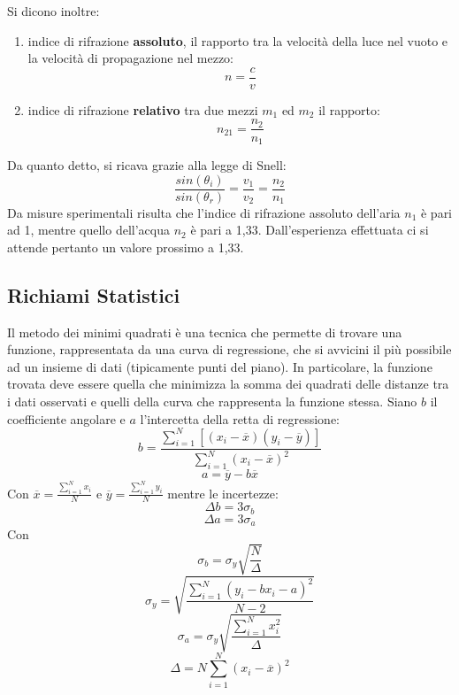 Si dicono inoltre:
\begin{enumerate}
    \item indice di rifrazione \textbf{assoluto}, il rapporto tra la velocità della luce nel vuoto e la velocità di propagazione nel mezzo: 
    \begin{equation}
        n = \frac{c}{v}
    \end{equation}
    \item indice di rifrazione \textbf{relativo} tra due mezzi $m_1$ ed $m_2$ il rapporto:
    \begin{equation}
        n_{21} = \frac{n_2}{n_1}
    \end{equation}
\end{enumerate}
Da quanto detto, si ricava grazie alla legge di Snell:
\begin{equation}
    \frac{sin(\theta_i)}{sin(\theta_r)} = \frac{v_1}{v_2} = \frac{n_2}{n_1}
\end{equation}
Da misure sperimentali risulta che l'indice di rifrazione assoluto dell'aria $n_1$ è pari ad 1, mentre quello dell'acqua $n_2$ è pari a 1,33. Dall'esperienza effettuata ci si attende pertanto un valore prossimo a 1,33.



\subsection{Richiami Statistici}
Il metodo dei minimi quadrati è una tecnica che permette di trovare una funzione, rappresentata da una curva di regressione, che si avvicini il più possibile ad un insieme di dati (tipicamente punti del piano). In particolare, la funzione trovata deve essere quella che minimizza la somma dei quadrati delle distanze tra i dati osservati e quelli della curva che rappresenta la funzione stessa. Siano $b$ il coefficiente angolare e $a$ l'intercetta della retta di regressione:
\begin{equation}
	b=\frac{\displaystyle\sum_{i=1}^{N}[(x_i-\overline{x})(y_i-\overline{y})]}{\displaystyle\sum_{i=1}^{N}(x_i-\overline{x})^2}
\end{equation}
\begin{equation}
	a=\overline{y}-b\overline{x}
\end{equation}
Con $\overline{x}=\frac{\displaystyle\sum_{i=1}^{N}x_i}{N}$ e $\overline{y}=\frac{\displaystyle\sum_{i=1}^{N}y_i}{N}$
mentre le incertezze:
\begin{equation}
	\Delta b=3\sigma_b
\end{equation}
\begin{equation}
	\Delta a=3\sigma_a
\end{equation}
Con $$\sigma_b=\sigma_y\sqrt{\frac{N}{\Delta}}$$
$$\sigma_y=\sqrt{\frac{\displaystyle\sum_{i=1}^{N}(y_i-bx_i-a)^2}{N-2}}$$
$$\sigma_a=\sigma_y\sqrt{\frac{\displaystyle\sum_{i=1}^{N}x_i^2}{\Delta}}$$
$$\Delta=N\displaystyle\sum_{i=1}^{N}(x_i-\overline{x})^2$$

